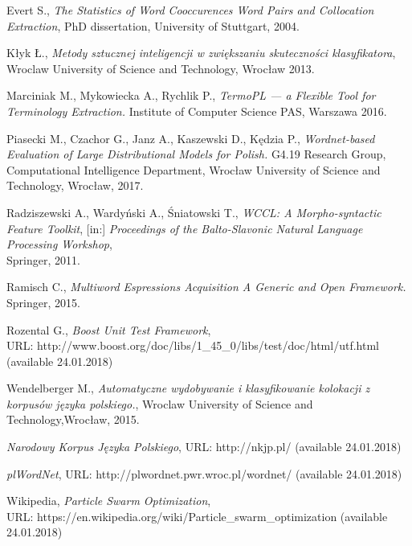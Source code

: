 \begin{thebibliography}{9}

Evert S.,
\textit{The Statistics of Word Cooccurences Word Pairs and Collocation Extraction}, 
PhD dissertation, University of Stuttgart, 2004.

Kłyk Ł., \emph{Metody sztucznej inteligencji w zwiększaniu skuteczności klasyfikatora}, \\
Wroclaw University of Science and Technology, Wrocław 2013.

Marciniak M., Mykowiecka A., Rychlik P.,
\textit{TermoPL — a Flexible Tool for Terminology Extraction.} 
Institute of Computer Science PAS, Warszawa 2016.

Piasecki M., Czachor G., Janz A., Kaszewski D., Kędzia P.,
\textit{Wordnet-based Evaluation of Large Distributional Models for Polish.} 
G4.19 Research Group, Computational Intelligence Department, Wrocław University of Science and Technology, Wrocław, 2017.

Radziszewski A., Wardyński A., Śniatowski T., \emph{WCCL: A Morpho-syntactic Feature Toolkit}, [in:] \emph{Proceedings of the Balto-Slavonic Natural Language Processing Workshop}, \\
Springer, 2011.

Ramisch C., 
\textit{Multiword Espressions Acquisition A Generic and Open Framework.} 
Springer, 2015.

Rozental G., \textit{Boost Unit Test Framework}, \\
URL: http://www.boost.org/doc/libs/1\_45\_0/libs/test/doc/html/utf.html (available 24.01.2018)

Wendelberger M., 
\textit{Automatyczne wydobywanie i klasyfikowanie kolokacji z korpusów języka polskiego.}, 
Wroclaw University of Science and Technology,Wrocław, 2015.

\textit{Narodowy Korpus Języka Polskiego}, 
URL: http://nkjp.pl/ (available 24.01.2018)

\textit{plWordNet}, 
URL: http://plwordnet.pwr.wroc.pl/wordnet/ (available 24.01.2018)

Wikipedia, \textit{Particle Swarm Optimization}, \\
URL: https://en.wikipedia.org/wiki/Particle\_swarm\_optimization (available 24.01.2018)


\end{thebibliography}